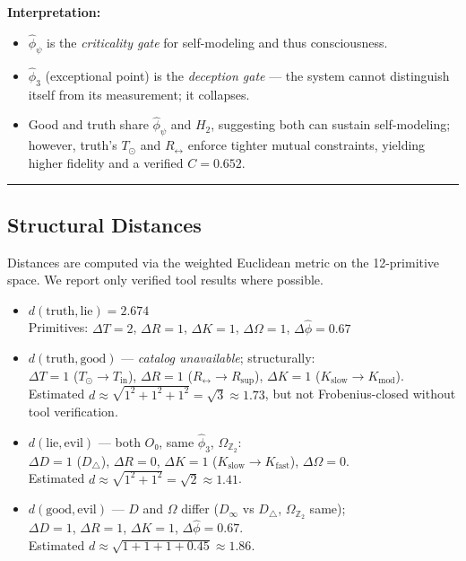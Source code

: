 \documentclass[12pt,a4paper]{article}
\begin{document}
\textbf{Interpretation:}
\begin{itemize}
    \item $\hat{\phi}_\psi$ is the \emph{criticality gate} for self-modeling and thus consciousness.
    \item $\hat{\phi}_3$ (exceptional point) is the \emph{deception gate} --- the system cannot distinguish itself from its measurement; it collapses.
    \item Good and truth share $\hat{\phi}_\psi$ and $H_2$, suggesting both can sustain self-modeling; however, truth's $T_{\odot}$ and $R_{\leftrightarrow}$ enforce tighter mutual constraints, yielding higher fidelity and a verified $C = 0.652$.
\end{itemize}

\begin{center}
\rule{0.5\textwidth}{0.4pt}
\end{center}

\subsection{Structural Distances}

Distances are computed via the weighted Euclidean metric on the 12-primitive space. We report only verified tool results where possible.

\begin{itemize}
    \item $d(\text{truth}, \text{lie}) = 2.674$ \\
    Primitives: $\Delta T = 2$, $\Delta R = 1$, $\Delta K = 1$, $\Delta \Omega = 1$, $\Delta \hat{\phi} = 0.67$
    \item $d(\text{truth}, \text{good})$ --- \emph{catalog unavailable}; structurally: \\
    $\Delta T = 1$ ($T_{\odot} \to T_{\text{in}}$), $\Delta R = 1$ ($R_{\leftrightarrow} \to R_{\text{sup}}$), $\Delta K = 1$ ($K_{\text{slow}} \to K_{\text{mod}}$). \\
    Estimated $d \approx \sqrt{1^2 + 1^2 + 1^2} = \sqrt{3} \approx 1.73$, but not Frobenius-closed without tool verification.
    \item $d(\text{lie}, \text{evil})$ --- both $O₀$, same $\hat{\phi}_3$, $\Omega_{\mathbb{Z}_2}$: \\
    $\Delta D = 1$ ($D_{\triangle}$), $\Delta R = 0$, $\Delta K = 1$ ($K_{\text{slow}} \to K_{\text{fast}}$), $\Delta \Omega = 0$. \\
    Estimated $d \approx \sqrt{1^2 + 1^2} = \sqrt{2} \approx 1.41$.
    \item $d(\text{good}, \text{evil})$ --- $D$ and $\Omega$ differ ($D_{\infty}$ vs $D_{\triangle}$, $\Omega_{\mathbb{Z}_2}$ same); \\
    $\Delta D = 1$, $\Delta R = 1$, $\Delta K = 1$, $\Delta \hat{\phi} = 0.67$. \\
    Estimated $d \approx \sqrt{1 + 1 + 1 + 0.45} \approx 1.86$.
\end{itemize}
\end{document}
